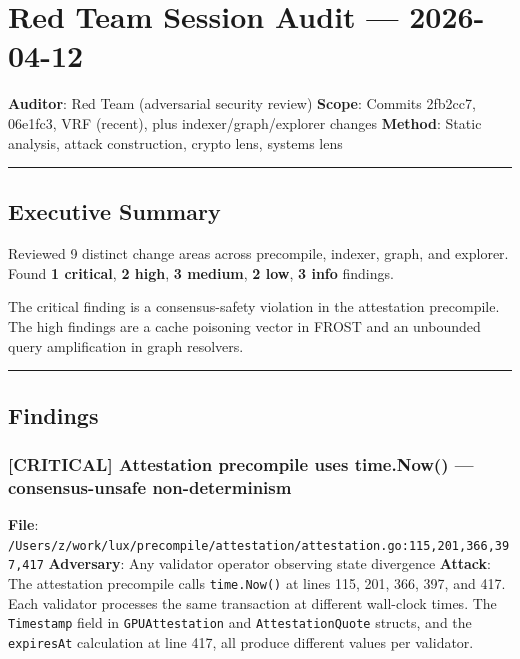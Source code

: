 \documentclass[
]{article}
\author{}
\date{}
\begin{document}
\section{Red Team Session Audit ---
2026-04-12}\label{red-team-session-audit--2026-04-12}

\textbf{Auditor}: Red Team (adversarial security review) \textbf{Scope}:
Commits 2fb2cc7, 06e1fc3, VRF (recent), plus indexer/graph/explorer
changes \textbf{Method}: Static analysis, attack construction, crypto
lens, systems lens

\begin{center}\rule{0.5\linewidth}{0.5pt}\end{center}

\subsection{Executive Summary}\label{executive-summary}

Reviewed 9 distinct change areas across precompile, indexer, graph, and
explorer. Found \textbf{1 critical}, \textbf{2 high}, \textbf{3 medium},
\textbf{2 low}, \textbf{3 info} findings.

The critical finding is a consensus-safety violation in the attestation
precompile. The high findings are a cache poisoning vector in FROST and
an unbounded query amplification in graph resolvers.

\begin{center}\rule{0.5\linewidth}{0.5pt}\end{center}

\subsection{Findings}\label{findings}

\subsubsection{{[}CRITICAL{]} Attestation precompile uses time.Now() ---
consensus-unsafe
non-determinism}\label{critical-attestation-precompile-uses-timenow--consensus-unsafe-non-determinism}

\textbf{File}:
\texttt{/Users/z/work/lux/precompile/attestation/attestation.go:115,201,366,397,417}
\textbf{Adversary}: Any validator operator observing state divergence
\textbf{Attack}: The attestation precompile calls \texttt{time.Now()} at
lines 115, 201, 366, 397, and 417. Each validator processes the same
transaction at different wall-clock times. The \texttt{Timestamp} field
in \texttt{GPUAttestation} and \texttt{AttestationQuote} structs, and
the \texttt{expiresAt} calculation at line 417, all produce different
values per validator.
\end{document}
